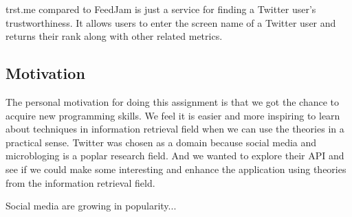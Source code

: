 trst.me compared to FeedJam is just a service for finding a Twitter user's trustworthiness. It allows users to enter the screen name of a Twitter user and returns their rank along with other related metrics.  

\subsection{Motivation} %
The personal motivation for doing this assignment is that we got the chance to acquire new programming skills. We feel it is easier and more inspiring to learn about techniques in information retrieval field when we can use the theories in a practical sense. Twitter was chosen as a domain because social media and microbloging is a poplar research field. And we wanted to explore their API and see if we could make some interesting and enhance the application using theories from the information retrieval field. 

Social media are growing in popularity...

